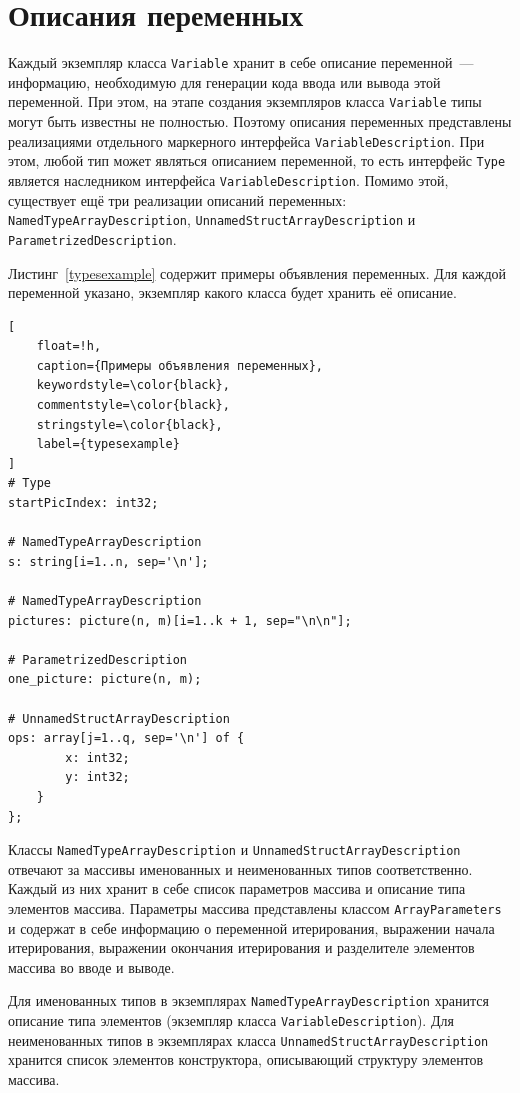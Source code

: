 \documentclass[times,specification,annotation]{style/itmo-student-thesis/itmo-student-thesis}
\begin{document}
\section{Описания переменных}

Каждый экземпляр класса \texttt{Variable} хранит в себе описание переменной~--- информацию, необходимую для генерации кода ввода или вывода этой переменной. При этом, на этапе создания экземпляров класса \texttt{Variable} типы могут быть известны не полностью. Поэтому описания переменных представлены реализациями отдельного маркерного интерфейса \texttt{VariableDescription}. При этом, любой тип может являться описанием переменной, то есть интерфейс \texttt{Type} является наследником интерфейса \texttt{VariableDescription}. Помимо этой, существует ещё три реализации описаний переменных: \texttt{NamedTypeArrayDescription}, \texttt{UnnamedStructArrayDescription} и \texttt{ParametrizedDescription}.

Листинг~\ref{typesexample} содержит примеры объявления переменных. Для каждой переменной указано, экземпляр какого класса будет хранить её описание.

\begin{lstlisting}[
    float=!h,
    caption={Примеры объявления переменных},
    keywordstyle=\color{black},
    commentstyle=\color{black},
    stringstyle=\color{black},
    label={typesexample}
]
# Type
startPicIndex: int32; 

# NamedTypeArrayDescription
s: string[i=1..n, sep='\n']; 

# NamedTypeArrayDescription
pictures: picture(n, m)[i=1..k + 1, sep="\n\n"]; 

# ParametrizedDescription
one_picture: picture(n, m); 

# UnnamedStructArrayDescription
ops: array[j=1..q, sep='\n'] of { 
        x: int32;
        y: int32;
    }
};
\end{lstlisting}

Классы \texttt{NamedTypeArrayDescription} и \texttt{UnnamedStructArrayDescription} отвечают за массивы именованных и неименованных типов соответственно. Каждый из них хранит в себе список параметров массива и описание типа элементов массива. Параметры массива представлены классом \texttt{ArrayParameters} и содержат в себе информацию о переменной итерирования, выражении начала итерирования, выражении окончания итерирования и разделителе элементов массива во вводе и выводе.

Для именованных типов в экземплярах \texttt{NamedTypeArrayDescription} хранится описание типа элементов (экземпляр класса \texttt{VariableDescription}). Для неименованных типов в экземплярах класса \texttt{UnnamedStructArrayDescription} хранится список элементов конструктора, описывающий структуру элементов массива.
\end{document}
